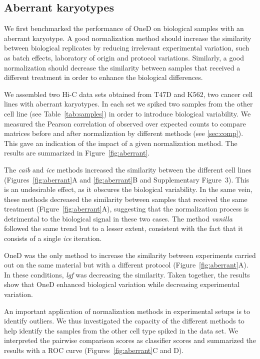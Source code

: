 \documentclass{bioinfo}
\begin{document}
\subsection{Aberrant karyotypes}

We first benchmarked the performance of OneD on biological samples with an
aberrant karyotype. A good normalization method should increase the
similarity between biological replicates by reducing irrelevant
experimental variation, such as batch effects, laboratory of origin and
protocol variations. Similarly, a good normalization should decrease the
similarity between samples that received a different treatment in order to
enhance the biological differences.

We assembled two Hi-C data sets obtained from T47D and K562, two cancer
cell lines with aberrant karyotypes. In each set we spiked two
samples from the other cell line (see Table~\ref{tab:samples}) in order to
introduce biological variability. We measured the Pearson correlation of
observed over expected counts to compare matrices before and after
normalization by different methods (see \ref{sec:comp}). This gave an
indication of the impact of a given normalization method. The results are
summarized in Figure~\ref{fig:aberrant}.

The \textit{caib} and \textit{ice} methods increased the similarity
between the different cell lines (Figures~\ref{fig:aberrant}A and
\ref{fig:aberrant}B and Supplementary Figure~3). This is an undesirable
effect, as it obscures the biological variability. In the same vein, these
methods decreased the similarity between samples that received the same
treatment (Figure~\ref{fig:aberrant}A), suggesting that the normalization
process is detrimental to the biological signal in these two cases. The
method \textit{vanilla} followed the same trend but to a lesser extent,
consistent with the fact that it consists of a single \textit{ice}
iteration.

OneD was the only method to increase the similarity between experiments
carried out on the same material but with a different protocol
(Figure~\ref{fig:aberrant}A). In these conditions, \textit{lgf} was
decreasing the similarity. Taken together, the results show that OneD
enhanced biological variation while decreasing experimental variation. 

An important application of normalization methods in experimental setups
is to identify outliers. We thus investigated the capacity of the
different methods to help identify the samples from the other cell type
spiked in the data set. We interpreted the pairwise comparison scores as
classifier scores and summarized the results with a ROC curve
(Figures~\ref{fig:aberrant}C and D).
\end{document}
